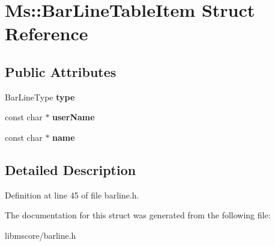 \hypertarget{struct_ms_1_1_bar_line_table_item}{}\section{Ms\+:\+:Bar\+Line\+Table\+Item Struct Reference}
\label{struct_ms_1_1_bar_line_table_item}
\subsection*{Public Attributes}
\begin{DoxyCompactItemize}
\item 
\mbox{\label{struct_ms_1_1_bar_line_table_item_a47f1f3d67814a7ed2f74a9efd2ee0a11}} 
Bar\+Line\+Type {\bfseries type}
\item 
\mbox{\label{struct_ms_1_1_bar_line_table_item_a351e159325c22a2c46965ebd197bd0f8}} 
const char $\ast$ {\bfseries user\+Name}
\item 
\mbox{\label{struct_ms_1_1_bar_line_table_item_add06e8be15d69dfe5c1c79c13dced826}} 
const char $\ast$ {\bfseries name}
\end{DoxyCompactItemize}


\subsection{Detailed Description}


Definition at line 45 of file barline.\+h.



The documentation for this struct was generated from the following file\+:\begin{DoxyCompactItemize}
\item 
libmscore/barline.\+h\end{DoxyCompactItemize}

